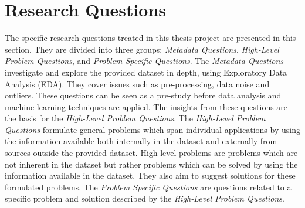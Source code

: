 \section{Research Questions}
\label{sec:research-questions}
The specific research questions treated in this thesis project are presented in this section.
They are divided into three groups: \textit{Metadata Questions}, \textit{High-Level Problem Questions}, and \textit{Problem Specific Questions}.
The \textit{Metadata Questions} investigate and explore the provided dataset in depth, using Exploratory Data Analysis (EDA).
They cover issues such as pre-processing, data noise and outliers.
These questions can be seen as a pre-study before data analysis and machine learning techniques are applied.
The insights from these questions are the basis for the \textit{High-Level Problem Questions}.
The \textit{High-Level Problem Questions} formulate general problems which span individual applications by using the information available both internally in the dataset and externally from sources outside the provided dataset.
High-level problems are problems which are not inherent in the dataset but rather problems which can be solved by using the information available in the dataset.
They also aim to suggest solutions for these formulated problems.
The \textit{Problem Specific Questions} are questions related to a specific problem and solution described by the \textit{High-Level Problem Questions}.

